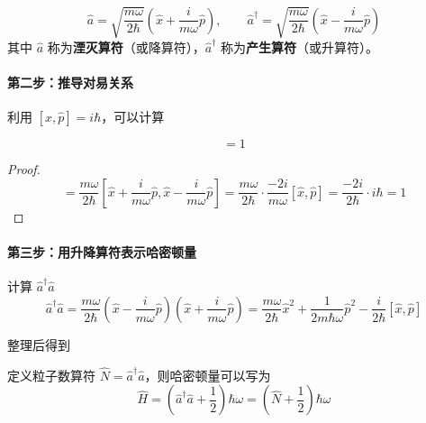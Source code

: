 \begin{definition}[升降算符]
    \begin{equation}
        \hat{a} = \sqrt{\frac{m\omega}{2\hbar}}\left(\hat{x} + \frac{i}{m\omega}\hat{p}\right), \qquad \hat{a}^\dagger = \sqrt{\frac{m\omega}{2\hbar}}\left(\hat{x} - \frac{i}{m\omega}\hat{p}\right)
    \end{equation}
    其中 $\hat{a}$ 称为\textbf{湮灭算符}（或降算符），$\hat{a}^\dagger$ 称为\textbf{产生算符}（或升算符）。
\end{definition}

\paragraph*{第二步：推导对易关系}

利用 $[\hat{x}, \hat{p}] = i\hbar$，可以计算

\begin{theorem}[升降算符的对易关系]
    \begin{equation}
        [\hat{a}, \hat{a}^\dagger] = 1
    \end{equation}
\end{theorem}

\begin{proof}
    \begin{equation}
        [\hat{a}, \hat{a}^\dagger] = \frac{m\omega}{2\hbar}\left[\hat{x} + \frac{i}{m\omega}\hat{p}, \hat{x} - \frac{i}{m\omega}\hat{p}\right] = \frac{m\omega}{2\hbar}\cdot\frac{-2i}{m\omega}[\hat{x}, \hat{p}] = \frac{-2i}{2\hbar}\cdot i\hbar = 1
    \end{equation}
\end{proof}

\paragraph*{第三步：用升降算符表示哈密顿量}

计算 $\hat{a}^\dagger\hat{a}$
\begin{equation}
    \hat{a}^\dagger\hat{a} = \frac{m\omega}{2\hbar}\left(\hat{x} - \frac{i}{m\omega}\hat{p}\right)\left(\hat{x} + \frac{i}{m\omega}\hat{p}\right) = \frac{m\omega}{2\hbar}\hat{x}^2 + \frac{1}{2m\hbar\omega}\hat{p}^2 - \frac{i}{2\hbar}[\hat{x}, \hat{p}]
\end{equation}

整理后得到

\begin{theorem}[哈密顿量的因式分解]
    定义粒子数算符 $\hat{N} = \hat{a}^\dagger\hat{a}$，则哈密顿量可以写为
    \begin{equation}
        \hat{H} = \left(\hat{a}^\dagger\hat{a} + \frac{1}{2}\right)\hbar\omega = \left(\hat{N} + \frac{1}{2}\right)\hbar\omega
    \end{equation}
\end{theorem}

